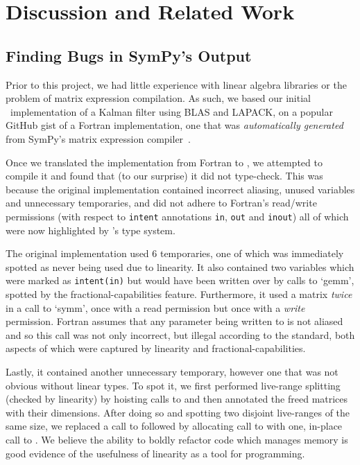 \section{Discussion and Related Work}\label{sec:discussion_related_work}

\subsection{Finding Bugs in SymPy's Output}\label{subsec:finding_bugs}

Prior to this project, we had little experience with linear algebra libraries
or the problem of matrix expression compilation. As such, we based our initial
\lang\ implementation of a Kalman filter using BLAS and LAPACK, on a popular
GitHub gist of a Fortran implementation, one that was \emph{automatically
generated} from SymPy's matrix expression compiler~\cite{rocklin_thesis}.

Once we translated the implementation from Fortran to \lang, we attempted to
compile it and found that (to our surprise) it did not type-check. This was
because the original implementation contained incorrect aliasing, unused
variables and unnecessary temporaries, and did not adhere to Fortran's
read/write permissions (with respect to \texttt{intent} annotations
\texttt{in}, \texttt{out} and \texttt{inout}) all of which were now highlighted
by \lang's type system.

The original implementation used 6 temporaries, one of which was immediately
spotted as never being used due to linearity. It also contained two variables
which were marked as \texttt{intent(in)} but would have been written over by
calls to `gemm', spotted by the fractional-capabilities feature. Furthermore,
it used a matrix \emph{twice} in a call to `symm', once with a read permission
but once with a \emph{write} permission.  Fortran assumes that any parameter
being written to is not aliased and so this call was not only incorrect, but
illegal according to the standard, both aspects of which were captured by
linearity and fractional-capabilities.

Lastly, it contained another unnecessary temporary, however one that was not
obvious without linear types. To spot it, we first performed live-range
splitting (checked by linearity) by hoisting calls to  and then
annotated the freed matrices with their dimensions.  After doing so and
spotting two disjoint live-ranges of the same size, we replaced a call to
 followed by allocating call to  with one, in-place
call to . We believe the ability to boldly refactor code which
manages memory is good evidence of the usefulness of linearity as a tool for
programming.

